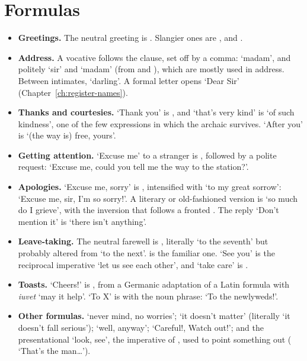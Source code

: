 \section{Formulas}\label{sec:formulas}
\begin{itemize}
    \item \textbf{Greetings.} The neutral greeting is . Slangier ones are ,  and .
    \item \textbf{Address.} A vocative follows the clause, set off by a comma:  `madam', and politely  `sir' and  `madam' (from  and ), which are mostly used in address. Between intimates,  `darling'. A formal letter opens  `Dear Sir' (Chapter~\ref{ch:register-names}).
    \item \textbf{Thanks and courtesies.} `Thank you' is , and `that's very kind' is  `of such kindness', one of the few expressions in which the archaic  survives. `After you' is  `(the way is) free, yours'.
    \item \textbf{Getting attention.} `Excuse me' to a stranger is , followed by a polite request:  `Excuse me, could you tell me the way to the station?'.
    \item \textbf{Apologies.} `Excuse me, sorry' is , intensified with  `to my great sorrow':  `Excuse me, sir, I'm so sorry!'. A literary or old-fashioned version is  `so much do I grieve', with the inversion that follows a fronted . The reply `Don't mention it' is  `there isn't anything'.
    \item \textbf{Leave-taking.} The neutral farewell is , literally `to the seventh' but probably altered from  `to the next'.  is the familiar one. `See you' is the reciprocal imperative  `let us see each other', and `take care' is .
    \item \textbf{Toasts.} `Cheers!' is , from a Germanic adaptation of a Latin formula with \textit{iuvet} `may it help'. `To X' is  with the noun phrase:  `To the newlyweds!'.
    \item \textbf{Other formulas.}  `never mind, no worries';  `it doesn't matter' (literally `it doesn't fall serious');  `well, anyway';  `Careful!, Watch out!'; and the presentational  `look, see', the imperative of , used to point something out ( `That's the man\ldots').
\end{itemize}
